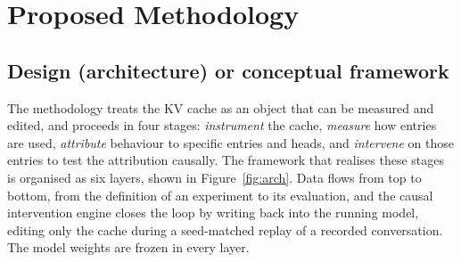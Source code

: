 \chapter{Proposed Methodology}
\section{Design (architecture) or conceptual framework}
The methodology treats the KV cache as an object that can be measured and edited, and proceeds in four stages: \emph{instrument} the cache, \emph{measure} how entries are used, \emph{attribute} behaviour to specific entries and heads, and \emph{intervene} on those entries to test the attribution causally. The framework that realises these stages is organised as six layers, shown in Figure~\ref{fig:arch}. Data flows from top to bottom, from the definition of an experiment to its evaluation, and the causal intervention engine closes the loop by writing back into the running model, editing only the cache during a seed-matched replay of a recorded conversation. The model weights are frozen in every layer.

